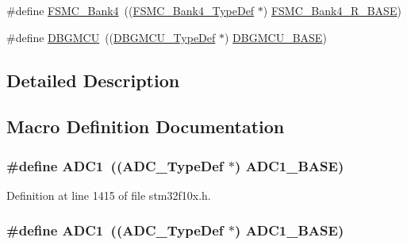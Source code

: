 \begin{DoxyCompactItemize}
\item 
\#define \hyperlink{group___peripheral__declaration_ga5aa00e4ac522693c6a21bc23ef5a96df}{F\+S\+M\+C\+\_\+\+Bank4}~((\hyperlink{struct_f_s_m_c___bank4___type_def}{F\+S\+M\+C\+\_\+\+Bank4\+\_\+\+Type\+Def} $\ast$) \hyperlink{openmotestm_2library_2inc_2stm32f10x__map_8h_af9e5417133160b0bdd0498d982acec19}{F\+S\+M\+C\+\_\+\+Bank4\+\_\+\+R\+\_\+\+B\+A\+SE})
\item 
\#define \hyperlink{group___peripheral__declaration_ga92ec6d9ec2251fda7d4ce09748cd74b4}{D\+B\+G\+M\+CU}~((\hyperlink{struct_d_b_g_m_c_u___type_def}{D\+B\+G\+M\+C\+U\+\_\+\+Type\+Def} $\ast$) \hyperlink{openmotestm_2library_2inc_2stm32f10x__map_8h_a4adaf4fd82ccc3a538f1f27a70cdbbef}{D\+B\+G\+M\+C\+U\+\_\+\+B\+A\+SE})
\end{DoxyCompactItemize}


\subsection{Detailed Description}


\subsection{Macro Definition Documentation}
\subsubsection[{\texorpdfstring{A\+D\+C1}{ADC1}}]{\setlength{\rightskip}{0pt plus 5cm}\#define A\+D\+C1~(({\bf A\+D\+C\+\_\+\+Type\+Def} $\ast$) {\bf A\+D\+C1\+\_\+\+B\+A\+SE})}\hypertarget{group___peripheral__declaration_ga90d2d5c526ce5c0a551f533eccbee71a}{}\label{group___peripheral__declaration_ga90d2d5c526ce5c0a551f533eccbee71a}


Definition at line 1415 of file stm32f10x.\+h.

\subsubsection[{\texorpdfstring{A\+D\+C1}{ADC1}}]{\setlength{\rightskip}{0pt plus 5cm}\#define A\+D\+C1~(({\bf A\+D\+C\+\_\+\+Type\+Def} $\ast$) {\bf A\+D\+C1\+\_\+\+B\+A\+SE})}\hypertarget{group___peripheral__declaration_ga90d2d5c526ce5c0a551f533eccbee71a}{}\label{group___peripheral__declaration_ga90d2d5c526ce5c0a551f533eccbee71a}


